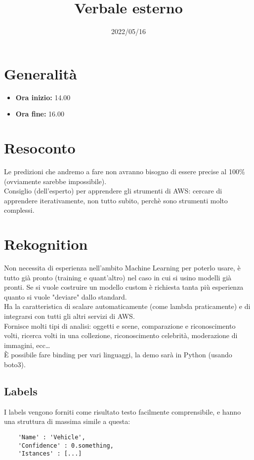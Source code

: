 \documentclass{classes/base}
\title{Verbale esterno}
\date{2022/05/16}
\author{\marcob}
\renewcommand{\maketitle}{
    
}
\begin{document}
    \maketitle

    \section*{Generalità}
    \begin{itemize}
        \item \textbf{Ora inizio:} 14.00
        \item \textbf{Ora fine:} 16.00
    \end{itemize}

    \section*{Resoconto}
    Le predizioni che andremo a fare non avranno bisogno di essere precise al 100\% (ovviamente sarebbe impossibile).\\
    Consiglio (dell'esperto) per apprendere gli strumenti di AWS: cercare di apprendere iterativamente, non tutto subito, perchè sono strumenti molto complessi.\\

    \section*{Rekognition}
    Non necessita di esperienza nell'ambito Machine Learning per poterlo usare, è tutto già pronto (training e quant'altro) nel caso in cui si usino modelli già pronti.
    Se si vuole costruire un modello custom è richiesta tanta più esperienza quanto si vuole "deviare" dallo standard.\\
    Ha la caratteristica di scalare automaticamente (come lambda praticamente) e di integrarsi con tutti gli altri servizi di AWS.\\
    Fornisce molti tipi di analisi: oggetti e scene, comparazione e riconoscimento volti, ricerca volti in una collezione, riconoscimento celebrità, moderazione di immagini, ecc… \\
    È possibile fare binding per vari linguaggi, la demo sarà in Python (usando boto3).

    \subsection*{Labels}
    I labels vengono forniti come risultato testo facilmente comprensibile, e hanno una struttura di massima simile a questa:
    \begin{lstlisting}
    'Name' : 'Vehicle',
    'Confidence' : 0.something,
    'Istances' : [...]
    \end{lstlisting}
\end{document}

